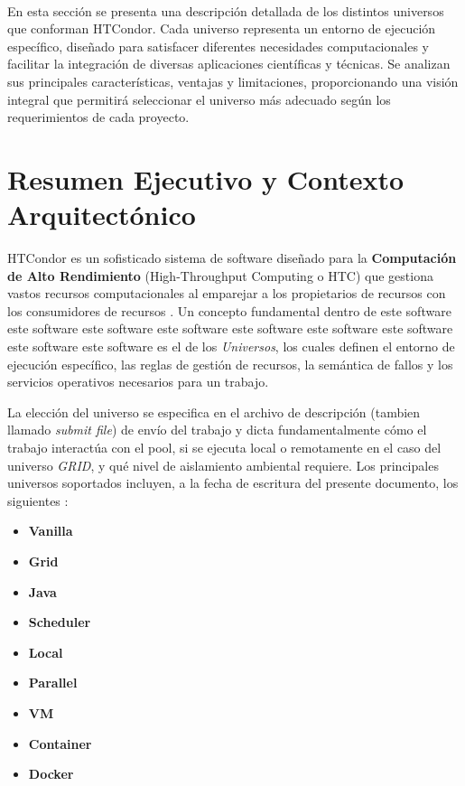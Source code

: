 \label{cap:caracterizacion-universos}
\mbox{}\\

En esta sección se presenta una descripción detallada de los distintos universos que conforman HTCondor. Cada universo representa un entorno de ejecución específico, diseñado para satisfacer diferentes necesidades computacionales y facilitar la integración de diversas aplicaciones científicas y técnicas. Se analizan sus principales características, ventajas y limitaciones, proporcionando una visión integral que permitirá seleccionar el universo más adecuado según los requerimientos de cada proyecto.



\section{Resumen Ejecutivo y Contexto Arquitectónico}

HTCondor es un sofisticado sistema de software diseñado para la \textbf{Computación de Alto Rendimiento} (High-Throughput Computing o HTC) que gestiona vastos recursos computacionales al emparejar a los propietarios de recursos con los consumidores de recursos \citep{HTCondor}. Un concepto fundamental dentro de este software este software este software este software este software este software este software este software este software es el de los \textit{Universos}, los cuales definen el entorno de ejecución específico, las reglas de gestión de recursos, la semántica de fallos y los servicios operativos necesarios para un trabajo.

La elección del universo se especifica en el archivo de descripción (tambien llamado \textit{submit file}) de envío del trabajo y dicta fundamentalmente cómo el trabajo interactúa con el pool, si se ejecuta local o remotamente en el caso del universo \textit{GRID}, y qué nivel de aislamiento ambiental requiere. Los principales universos soportados incluyen, a la fecha de escritura del presente documento, los siguientes \citep{HTCondor-choosing-universe}:

\begin{itemize}
	\item \textbf{Vanilla}
	\item \textbf{Grid}
	\item \textbf{Java}
	\item \textbf{Scheduler}
	\item \textbf{Local}
	\item \textbf{Parallel}
	\item \textbf{VM}
	\item \textbf{Container}
	\item \textbf{Docker}
\end{itemize}


